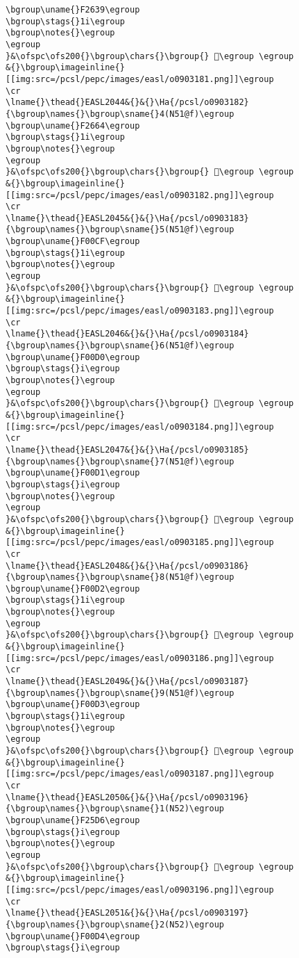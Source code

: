 \begin{verbatim}
\bgroup\uname{}F2639\egroup
\bgroup\stags{}1i\egroup
\bgroup\notes{}\egroup
\egroup
}&\ofspc\ofs200{}\bgroup\chars{}\bgroup{} 󲘹\egroup \egroup
&{}\bgroup\imageinline{}[[img:src=/pcsl/pepc/images/easl/o0903181.png]]\egroup
\cr
\lname{}\thead{}EASL2044&{}&{}\Ha{/pcsl/o0903182}{\bgroup\names{}\bgroup\sname{}4(N51@f)\egroup
\bgroup\uname{}F2664\egroup
\bgroup\stags{}1i\egroup
\bgroup\notes{}\egroup
\egroup
}&\ofspc\ofs200{}\bgroup\chars{}\bgroup{} 󲙤\egroup \egroup
&{}\bgroup\imageinline{}[[img:src=/pcsl/pepc/images/easl/o0903182.png]]\egroup
\cr
\lname{}\thead{}EASL2045&{}&{}\Ha{/pcsl/o0903183}{\bgroup\names{}\bgroup\sname{}5(N51@f)\egroup
\bgroup\uname{}F00CF\egroup
\bgroup\stags{}1i\egroup
\bgroup\notes{}\egroup
\egroup
}&\ofspc\ofs200{}\bgroup\chars{}\bgroup{} 󰃏\egroup \egroup
&{}\bgroup\imageinline{}[[img:src=/pcsl/pepc/images/easl/o0903183.png]]\egroup
\cr
\lname{}\thead{}EASL2046&{}&{}\Ha{/pcsl/o0903184}{\bgroup\names{}\bgroup\sname{}6(N51@f)\egroup
\bgroup\uname{}F00D0\egroup
\bgroup\stags{}i\egroup
\bgroup\notes{}\egroup
\egroup
}&\ofspc\ofs200{}\bgroup\chars{}\bgroup{} 󰃐\egroup \egroup
&{}\bgroup\imageinline{}[[img:src=/pcsl/pepc/images/easl/o0903184.png]]\egroup
\cr
\lname{}\thead{}EASL2047&{}&{}\Ha{/pcsl/o0903185}{\bgroup\names{}\bgroup\sname{}7(N51@f)\egroup
\bgroup\uname{}F00D1\egroup
\bgroup\stags{}i\egroup
\bgroup\notes{}\egroup
\egroup
}&\ofspc\ofs200{}\bgroup\chars{}\bgroup{} 󰃑\egroup \egroup
&{}\bgroup\imageinline{}[[img:src=/pcsl/pepc/images/easl/o0903185.png]]\egroup
\cr
\lname{}\thead{}EASL2048&{}&{}\Ha{/pcsl/o0903186}{\bgroup\names{}\bgroup\sname{}8(N51@f)\egroup
\bgroup\uname{}F00D2\egroup
\bgroup\stags{}1i\egroup
\bgroup\notes{}\egroup
\egroup
}&\ofspc\ofs200{}\bgroup\chars{}\bgroup{} 󰃒\egroup \egroup
&{}\bgroup\imageinline{}[[img:src=/pcsl/pepc/images/easl/o0903186.png]]\egroup
\cr
\lname{}\thead{}EASL2049&{}&{}\Ha{/pcsl/o0903187}{\bgroup\names{}\bgroup\sname{}9(N51@f)\egroup
\bgroup\uname{}F00D3\egroup
\bgroup\stags{}1i\egroup
\bgroup\notes{}\egroup
\egroup
}&\ofspc\ofs200{}\bgroup\chars{}\bgroup{} 󰃓\egroup \egroup
&{}\bgroup\imageinline{}[[img:src=/pcsl/pepc/images/easl/o0903187.png]]\egroup
\cr
\lname{}\thead{}EASL2050&{}&{}\Ha{/pcsl/o0903196}{\bgroup\names{}\bgroup\sname{}1(N52)\egroup
\bgroup\uname{}F25D6\egroup
\bgroup\stags{}i\egroup
\bgroup\notes{}\egroup
\egroup
}&\ofspc\ofs200{}\bgroup\chars{}\bgroup{} 󲗖\egroup \egroup
&{}\bgroup\imageinline{}[[img:src=/pcsl/pepc/images/easl/o0903196.png]]\egroup
\cr
\lname{}\thead{}EASL2051&{}&{}\Ha{/pcsl/o0903197}{\bgroup\names{}\bgroup\sname{}2(N52)\egroup
\bgroup\uname{}F00D4\egroup
\bgroup\stags{}i\egroup

\end{verbatim}
